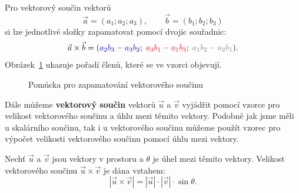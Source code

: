 \begin{remark}
    Pro vektorový součin vektorů
    \[
    \vec{a} = (a_1; a_2; a_3), \qquad \vec{b} = (b_1; b_2; b_3)
    \]
    si lze jednotlivé složky zapamatovat pomocí dvojic souřadnic:
    \[
    \vec{a} \times \vec{b}
    =
    ({\color{blue}a_2b_3 - a_3b_2};\; {\color{red}a_3b_1 - a_1b_3};\; {\color{gray}a_1b_2 - a_2b_1}).
    \]
    Obrázek~\ref{fig:cross_product_memory} ukazuje pořadí členů, které se ve vzorci objevují.


    \begin{figure}[H]
        \centering
        \caption{Pomůcka pro zapamatování vektorového součinu}
        \label{fig:cross_product_memory}
    \end{figure}
\end{remark}

Dále můžeme \textbf{vektorový součin} vektorů $\vec{u}$ a $\vec{v}$ vyjádřit pomocí vzorce pro velikost vektorového součinu a úhlu mezi těmito vektory.
Podobně jak jsme měli u skalárního součinu, tak i u vektorového součinu můžeme použít vzorec pro výpočet velikosti vektorového součinu pomocí úhlu mezi vektory.

\begin{definition}\label{def:cross_product_sin}
    Nechť $\vec{u}$ a $\vec{v}$ jsou vektory v prostoru a $\theta$ je úhel mezi těmito vektory. 
    Velikost vektorového součinu $\vec{u} \times \vec{v}$ je dána vztahem:
    \begin{equation}\label{eq:cross_product_sin}
        |\vec{u} \times \vec{v}| = |\vec{u}| \cdot |\vec{v}| \cdot \sin \theta.
    \end{equation}
    
\end{definition}

